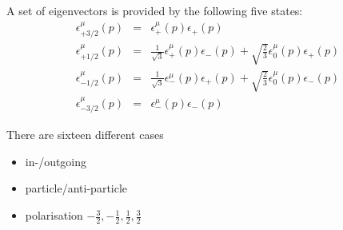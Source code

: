 \documentclass[a4paper,12pt]{amsart}
\begin{document}
A set of eigenvectors is provided by the following five states:
\begin{eqnarray}
\epsilon^\mu_{+3/2}(p) &=& \epsilon^\mu_+(p)\epsilon_+(p)\\
\epsilon^\mu_{+1/2}(p) &=&
   \frac1{\sqrt{3}}\epsilon^\mu_+(p)\epsilon_-(p)
  +\sqrt{\frac23}\epsilon^\mu_0(p)\epsilon_+(p) \\
\epsilon^\mu_{-1/2}(p) &=&
   \frac1{\sqrt{3}}\epsilon^\mu_-(p)\epsilon_+(p)
  +\sqrt{\frac23}\epsilon^\mu_0(p)\epsilon_-(p) \\
\epsilon^\mu_{-3/2}(p) &=& \epsilon^\mu_-(p)\epsilon_-(p)
\end{eqnarray}

There are sixteen different cases
\begin{itemize}
\item in-/outgoing
\item particle/anti-particle
\item polarisation $-\frac32, -\frac12, \frac12, \frac32$
\end{itemize}
\end{document}
